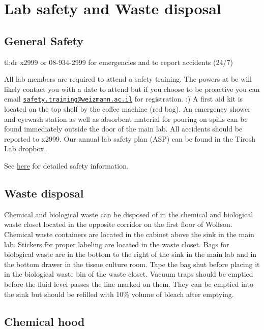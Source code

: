 \documentclass[
]{book}
\begin{document}
\hypertarget{safety}{%
\chapter{Lab safety and Waste disposal}\label{safety}}

\hypertarget{general-safety}{%
\section{General Safety}\label{general-safety}}

tl;dr x2999 or 08-934-2999 for emergencies and to report accidents (24/7)

All lab members are required to attend a safety training. The powers at be will likely contact you with a date to attend but if you choose to be proactive you can email \href{mailto:safety.training@weizmann.ac.il}{\nolinkurl{safety.training@weizmann.ac.il}} for registration. :) A first aid kit is located on the top shelf by the coffee machine (red bag). An emergency shower and eyewash station as well as absorbent material for pouring on spills can be found immediately outside the door of the main lab. All accidents should be reported to x2999. Our
annual lab safety plan (ASP) can be found in the Tirosh Lab dropbox.

See \href{https://www.weizmann.ac.il/safety/chemical-safety/general-guidelines}{here} for detailed safety information.

\hypertarget{waste-disposal}{%
\section{Waste disposal}\label{waste-disposal}}

Chemical and biological waste can be disposed of in the chemical and biological waste closet located in the opposite corridor on the first floor of Wolfson. Chemical waste containers are located in the cabinet above the sink in the main lab. Stickers for proper labeling are located in the waste closet. Bags for biological waste are in the bottom to the right of the sink in the main lab and in the bottom drawer in the tissue culture room. Tape the bag shut before placing it in the biological waste bin of the waste closet. Vacuum traps should be emptied before the fluid level passes the line marked on them. They can be emptied into the sink but should be refilled with 10\% volume of bleach after emptying.

\hypertarget{chemical-hood}{%
\section{Chemical hood}\label{chemical-hood}}
\end{document}
